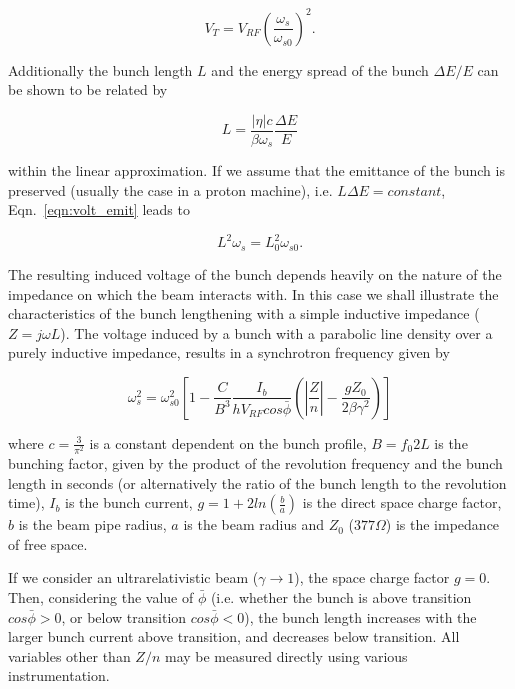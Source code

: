 \begin{equation}
V_{T} = V_{RF}\left(  \frac{\omega_{s}}{\omega_{s0}} \right)^{2}.
\label{eqn:volt_emit}
\end{equation}

Additionally the bunch length $L$ and the energy spread of the bunch $\Delta E/E$ can be shown to be related by

\begin{equation}
L = \frac{\left| \eta \right|c}{\beta\omega_{s}}\frac{\Delta E}{E}
\end{equation}

within the linear approximation. If we assume that the emittance of the bunch is preserved (usually the case in a proton machine), i.e. $L\Delta E = constant$, Eqn.~\ref{eqn:volt_emit} leads to

\begin{equation}
L^{2}\omega_{s} = L_{0}^{2}\omega_{s0}.
\end{equation}

The resulting induced voltage of the bunch depends heavily on the nature of the impedance on which the beam interacts with. In this case we shall illustrate the characteristics of the bunch lengthening with a simple inductive impedance ($Z = j\omega L$). The voltage induced by a bunch with a parabolic line density over a purely inductive impedance, results in a synchrotron frequency given by

\begin{equation}
\omega_{s}^{2} = \omega_{s0}^{2}\left[ 1 - \frac{C}{B^{3}} \frac{I_{b}}{hV_{RF}cos\bar{\phi}} \left( \left| \frac{Z}{n}  \right| - \frac{gZ_{0}}{2\beta\gamma^{2}}   \right)    \right]
\end{equation}

where $c = \frac{3}{\pi^{2}}$ is a constant dependent on the bunch profile, $B = f_{0}2L$ is the bunching
factor, given by the product of the revolution frequency and the bunch length in seconds (or alternatively the ratio of the bunch length to the revolution time), $I_{b}$ is the bunch current, $g = 1 + 2ln\left(\frac{b}{a} \right)$ is the direct space charge factor, $b$ is the beam pipe radius, $a$ is the beam radius and $Z_{0}$ ($377\Omega$) is the impedance of free space.

If we consider an ultrarelativistic beam ($\gamma \rightarrow 1$), the space charge factor $g = 0$. Then, considering the value of $\bar{\phi}$ (i.e. whether the bunch is above transition $cos\bar{\phi} > 0$, or below transition $cos\bar{\phi} < 0$), the bunch length increases with the larger bunch current above transition, and decreases below transition. All variables other than $Z/n$ may be measured directly using various instrumentation.


